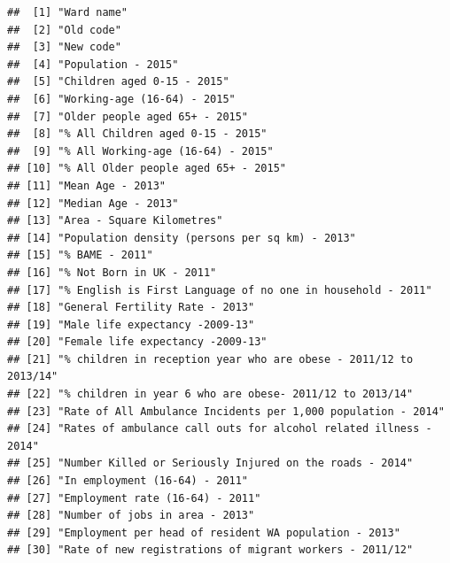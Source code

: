 \documentclass[]{book}
\begin{document}
\begin{verbatim}
##  [1] "Ward name"                                                                  
##  [2] "Old code"                                                                   
##  [3] "New code"                                                                   
##  [4] "Population - 2015"                                                          
##  [5] "Children aged 0-15 - 2015"                                                  
##  [6] "Working-age (16-64) - 2015"                                                 
##  [7] "Older people aged 65+ - 2015"                                               
##  [8] "% All Children aged 0-15 - 2015"                                            
##  [9] "% All Working-age (16-64) - 2015"                                           
## [10] "% All Older people aged 65+ - 2015"                                         
## [11] "Mean Age - 2013"                                                            
## [12] "Median Age - 2013"                                                          
## [13] "Area - Square Kilometres"                                                   
## [14] "Population density (persons per sq km) - 2013"                              
## [15] "% BAME - 2011"                                                              
## [16] "% Not Born in UK - 2011"                                                    
## [17] "% English is First Language of no one in household - 2011"                  
## [18] "General Fertility Rate - 2013"                                              
## [19] "Male life expectancy -2009-13"                                              
## [20] "Female life expectancy -2009-13"                                            
## [21] "% children in reception year who are obese - 2011/12 to 2013/14"            
## [22] "% children in year 6 who are obese- 2011/12 to 2013/14"                     
## [23] "Rate of All Ambulance Incidents per 1,000 population - 2014"                
## [24] "Rates of ambulance call outs for alcohol related illness - 2014"            
## [25] "Number Killed or Seriously Injured on the roads - 2014"                     
## [26] "In employment (16-64) - 2011"                                               
## [27] "Employment rate (16-64) - 2011"                                             
## [28] "Number of jobs in area - 2013"                                              
## [29] "Employment per head of resident WA population - 2013"                       
## [30] "Rate of new registrations of migrant workers - 2011/12"                     

\end{verbatim}
\end{document}

